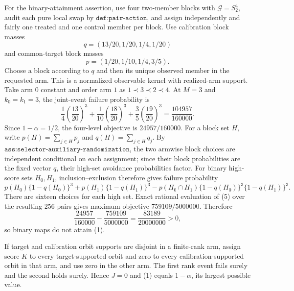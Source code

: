 For the binary-attainment assertion, use four two-member blocks with \(\mathcal G=S_2^4\), audit each pure local swap by \(\texttt{def:pair-action}\), and assign independently and fairly one treated and one control member per block. Use calibration block masses
\[q=(13/20,1/20,1/4,1/20)\]
and common-target block masses
\[p=(1/20,1/10,1/4,3/5).\]
Choose a block according to \(q\) and then its unique observed member in the requested arm. This is a normalized observable kernel with realized-arm support. Take arm \(0\) constant and order arm \(1\) as \(1\prec3\prec2\prec4\). At \(M=3\) and \(k_0=k_1=3\), the joint-event failure probability is
\[
\frac14\left(\frac{13}{20}\right)^3+\frac1{10}\left(\frac{18}{20}\right)^3+\frac35\left(\frac{19}{20}\right)^3=\frac{104957}{160000}.
\]
Since \(1-\alpha=1/2\), the four-level objective is \(24957/160000\). For a block set \(H\), write \(p(H)=\sum_{j\in H}p_j\) and \(q(H)=\sum_{j\in H}q_j\). By \(\texttt{ass:selector-auxiliary-randomization}\), the two armwise block choices are independent conditional on each assignment; since their block probabilities are the fixed vector \(q\), their high-set avoidance probabilities factor. For binary high-score sets \(H_0,H_1\), inclusion--exclusion therefore gives failure probability
\[
p(H_0)\{1-q(H_0)\}^3+p(H_1)\{1-q(H_1)\}^3-p(H_0\cap H_1)\{1-q(H_0)\}^3\{1-q(H_1)\}^3.
\tag{5}
\]
There are sixteen choices for each high set. Exact rational evaluation of (5) over the resulting \(256\) pairs gives maximum objective \(759109/5000000\). Therefore
\[
\frac{24957}{160000}-\frac{759109}{5000000}=\frac{83189}{20000000}>0,
\]
so binary maps do not attain (1).

If target and calibration orbit supports are disjoint in a finite-rank arm, assign score \(K\) to every target-supported orbit and zero to every calibration-supported orbit in that arm, and use zero in the other arm. The first rank event fails surely and the second holds surely. Hence \(J=0\) and (1) equals \(1-\alpha\), its largest possible value.

